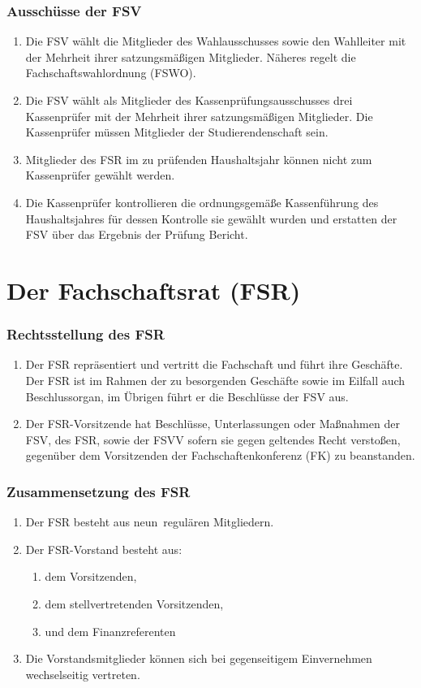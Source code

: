 \documentclass{article}
\newcommand{\fsrgroesse}{neun}
\begin{document}
\section{Ausschüsse der FSV}
\begin{enumerate}[(1)]
    \item Die FSV wählt die Mitglieder des Wahlausschusses sowie den Wahlleiter mit der Mehrheit ihrer satzungsmäßigen Mitglieder. Näheres regelt die Fachschaftswahlordnung (FSWO).
    \item Die FSV wählt als Mitglieder des Kassenprüfungsausschusses drei Kassenprüfer mit der Mehrheit ihrer satzungsmäßigen Mitglieder. Die Kassenprüfer müssen Mitglieder der Studierendenschaft sein.
    \item Mitglieder des FSR im zu prüfenden Haushaltsjahr können nicht zum Kassenprüfer gewählt werden.
    \item Die Kassenprüfer kontrollieren die ordnungsgemäße Kassenführung des Haushaltsjahres für dessen Kontrolle sie gewählt wurden und erstatten der FSV über das Ergebnis der Prüfung Bericht.
\end{enumerate}

\part{Der Fachschaftsrat (FSR)}
\section{Rechtsstellung des FSR}
\begin{enumerate}[(1)]
    \item Der FSR repräsentiert und vertritt die Fachschaft und führt ihre Geschäfte. Der FSR ist im Rahmen der zu besorgenden Geschäfte sowie im Eilfall auch Beschlussorgan, im Übrigen führt er die Beschlüsse der FSV aus.
    \item Der FSR-Vorsitzende hat Beschlüsse, Unterlassungen oder Maßnahmen der FSV, des FSR, sowie der FSVV sofern sie gegen geltendes Recht verstoßen, gegenüber dem Vorsitzenden der Fachschaftenkonferenz (FK) zu beanstanden.
\end{enumerate}

\section{Zusammensetzung des FSR}
\begin{enumerate}[(1)]
    \item Der FSR besteht aus \fsrgroesse \ regulären Mitgliedern.
    \item Der FSR-Vorstand besteht aus:
	\begin{enumerate}[1.]
		\item dem Vorsitzenden,
		\item dem stellvertretenden Vorsitzenden,
		\item und dem Finanzreferenten
	\end{enumerate}
	\item Die Vorstandsmitglieder können sich bei gegenseitigem Einvernehmen wechselseitig vertreten.
\end{enumerate}
\end{document}
